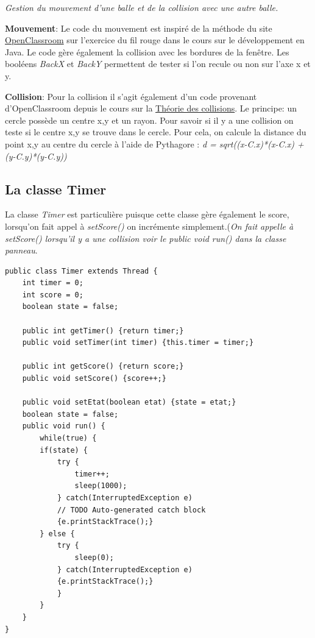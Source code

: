 \documentclass{article}
\begin{document}
\begin{center}
\textsl{Gestion du mouvement d'une balle et de la collision avec une autre balle.}
\end{center}

\textbf{Mouvement}: Le code du mouvement est inspiré de la 	méthode du site \href{https://openclassrooms.com/fr/courses/26832-apprenez-a-programmer-en-java/23193-le-fil-rouge-une-animation}{OpenClassroom} sur l'exercice du fil rouge dans le cours sur le 	développement en Java. 
Le code gère également la collision avec les bordures de la fenêtre. 
Les booléens \textit{BackX} et \textit{BackY} permettent de tester si l'on recule ou non sur l'axe x et y.

\vspace{5mm}

\textbf{Collision}: Pour la collision il s'agit également d'un code provenant d'OpenClassroom depuis le cours sur la \href{https://openclassrooms.com/fr/courses/1374826-theorie-des-collisions/1374988-formes-simples}{Théorie des collisions}.
\newline
Le principe: un cercle possède un centre x,y et un rayon. Pour savoir si il y a une collision on teste si le centre x,y se trouve dans le cercle. Pour cela, on calcule la distance du point x,y au centre du cercle à l'aide de Pythagore : \textit{d = sqrt((x-C.x)*(x-C.x) + (y-C.y)*(y-C.y))}
	
\subsection{La classe Timer}
La classe \textit{Timer} est particulière puisque cette classe gère également le score, lorsqu'on fait appel à \textit{setScore()} on incrémente simplement.(\textit{On fait appelle à setScore() lorsqu'il y a une collision voir le \textit{public void run()} dans la classe panneau}. 
\begin{verbatim}
public class Timer extends Thread {
    int timer = 0;
    int score = 0;
    boolean state = false;

    public int getTimer() {return timer;}
    public void setTimer(int timer) {this.timer = timer;}
	
    public int getScore() {return score;}
    public void setScore() {score++;}
    
    public void setEtat(boolean etat) {state = etat;}
    boolean state = false;
    public void run() {
        while(true) {
        if(state) {
            try {
                timer++;
                sleep(1000);
            } catch(InterruptedException e) 
            // TODO Auto-generated catch block
            {e.printStackTrace();}
        } else {
            try {
                sleep(0);
            } catch(InterruptedException e)
            {e.printStackTrace();}
            }
        }
    }
}
\end{verbatim}	
\end{document}
